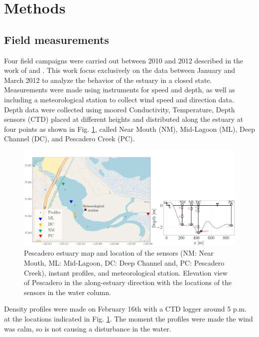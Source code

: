 \documentclass[tesis.tex]{subfiles}
\begin{document}
    
\section{Methods}

\subsection{Field measurements}

Four field campaigns were carried out between 2010 and 2012 described in the work of \cite{Williams2014} and \cite{williams2016}. This work focus exclusively on the data between January and March 2012 to analyze the behavior of the estuary in a closed state. Measurements were made using instruments for speed and depth, as well as including a meteorological station to collect wind speed and direction data. Depth data were collected using moored Conductivity, Temperature, Depth sensors (CTD) placed at different heights and distributed along the estuary at four points as shown in Fig. \ref{fig:mapPDO}, called Near Mouth (NM), Mid-Lagoon (ML), Deep Channel (DC), and Pescadero Creek (PC).\\

\begin{figure}[h!]
    \centering
    \includegraphics[width=\textwidth]{Imagenes/mapa3.png}
    \caption{Pescadero estuary map and location of the sensors (NM: Near Mouth, ML: Mid-Lagoon, DC: Deep Channel and, PC: Pescadero Creek), instant profiles, and meteorological station. Elevation view of Pescadero in the along-estuary direction with the locations of the sensors in the water column.}
    \label{fig:mapPDO}
\end{figure}

Density profiles were made on February 16th with a CTD logger around 5 p.m. at the locations indicated in Fig. \ref{fig:mapPDO}. The moment the profiles were made the wind was calm, so is not causing a disturbance in the water.\\
\end{document}
